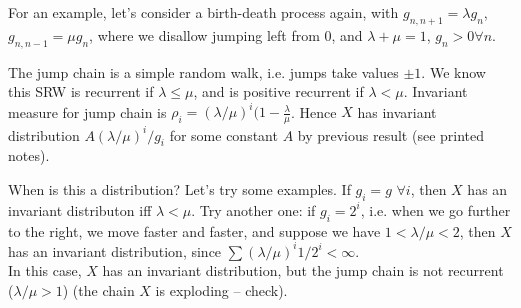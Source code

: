 \documentclass[a4paper]{article}
\begin{document}
For an example, let's consider a birth-death process again, with $g_{n,n+1} = \lambda g_n$, $g_{n,n-1} = \mu g_n$, where we disallow jumping left from $0$, and $\lambda + \mu = 1$, $g_n > 0 \forall n$.

The jump chain is a simple random walk, i.e. jumps take values $\pm 1$. We know this SRW is recurrent if $\lambda \leq \mu$, and is positive recurrent if $\lambda < \mu$. Invariant measure for jump chain is $\rho_i = (\lambda/\mu)^i (1-\frac{\lambda}{\mu}$. Hence $X$ has invariant distribution $A(\lambda/\mu)^i/g_i$ for some constant $A$ by previous result (see printed notes).

When is this a distribution? Let's try some examples. If $g_i = g$ $\forall i$, then $X$ has an invariant distributon iff $\lambda < \mu$. Try another one: if $g_i = 2^i$, i.e. when we go further to the right, we move faster and faster, and suppose we have $1<\lambda/\mu<2$, then $X$ has an invariant distribution, since $\sum (\lambda/\mu)^i 1/2^i < \infty$.\\
In this case, $X$ has an invariant distribution, but the jump chain is not recurrent ($\lambda/\mu>1$) (the chain $X$ is exploding -- check).
\end{document}
